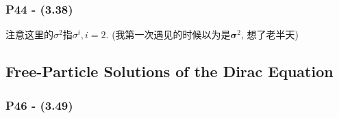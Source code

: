 \documentclass[cn,hazy,green,11pt,device=normal,chinesefont=founder]{elegantnote}
\begin{document}
\subsubsection{P44 - (3.38)}

注意这里的$\sigma^2$指$\sigma^i, i=2$. (我第一次遇见的时候以为是$\boldsymbol{\sigma}^2$, 想了老半天)

\subsection{Free-Particle Solutions of the Dirac Equation}

\subsubsection{P46 - (3.49)}\label{subsubsec: Boost_u_p}
\end{document}
